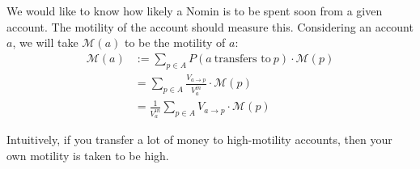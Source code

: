 \noindent We would like to know how likely a Nomin is to be spent soon from a given account.
The motility of the account should measure this. Considering an account \(a\), we will take
\(\mathcal{M}(a)\) to be the motility of \(a\):
\begin{align*}
    \mathcal{M}(a) &:= \sum_{p \in A}{P(a \ \text{transfers to} \ p) \cdot \mathcal{M}(p)} \\
    &= \sum_{p \in A}{\frac{V_{a \rightarrow p}}{V_{a}^{in}} \cdot \mathcal{M}(p)} \\
    &= \frac{1}{V_{a}^{in}} \sum_{p \in A}{V_{a \rightarrow p} \cdot \mathcal{M}(p)}
\end{align*}

Intuitively, if you transfer a lot of money to high-motility accounts, then your own motility is taken to be high.

